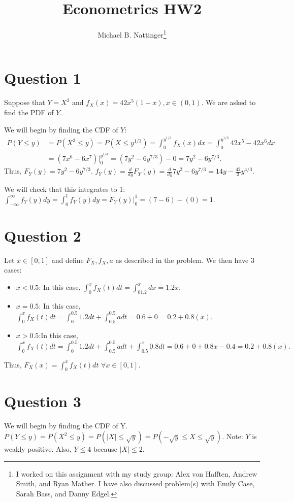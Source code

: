 \documentclass[11pt]{article} %
\title{Econometrics HW2}
\author{Michael B. Nattinger\footnote{I worked on this assignment with my study group: Alex von Hafften, Andrew Smith, and Ryan Mather. I have also discussed problem(s) with Emily Case, Sarah Bass, and Danny Edgel.}}
\begin{document}
\maketitle

\section{Question 1}
Suppose that $Y = X^{3}$ and $f_X(x) = 42x^5(1-x), x \in (0,1).$ We are asked to find the PDF of $Y$.

We will begin by finding the CDF of $Y$:
\begin{align*}
P(Y\leq y) &= P(X^{3} \leq y) = P(X \leq y^{1/3}) = \int_0^{y^{1/3}} f_X(x)dx =  \int_0^{y^{1/3}}42x^5 - 42x^6dx \\
&= (7x^6 - 6x^7)|^{y^{1/3}}_{0} = (7y^2 - 6y^{7/3}) - 0 = 7y^2 - 6y^{7/3}.
\end{align*}
Thus, $F_Y(y) =  7y^2 - 6y^{7/3}$. $f_Y(y) = \frac{d}{dy} F_Y(y) =  \frac{d}{dy} 7y^2 - 6y^{7/3} = 14y - \frac{42}{3}y^{4/3}$.

We will check that this integrates to 1:
$\int_{-\infty}^{\infty} f_Y(y)dy = \int_0^1f_Y(y)dy = F_Y(y)|^{1}_{0} = (7 - 6) - (0) = 1. $

\section{Question 2}
Let $x \in [0,1]$ and define $F_X,f_X,a$ as described in the problem. We then have 3 cases:

\begin{itemize}
\item $x<0.5$: In this case, $\int^{x}_0 f_X(t)dt = \int^{x}_01.2 dx = 1.2x.$
\item $x=0.5$: In this case,  $\int^{x}_0 f_X(t)dt = \int^{0.5}_0 1.2dt + \int^{0.5}_{0.5} a dt = 0.6 + 0 = 0.2+0.8(x).$
\item $x>0.5$:In this case,  $\int^{x}_0 f_X(t)dt = \int^{0.5}_0 1.2dt + \int^{0.5}_{0.5} a dt + \int^{x}_{0.5} 0.8 dt = 0.6 + 0 + 0.8x - 0.4 = 0.2+0.8(x).$
\end{itemize}

Thus, $F_X(x) = \int_0^x f_X(t)dt$ $\forall x \in [0,1].$

\section{Question 3}
We will begin by finding the CDF of Y. $P(Y\leq y) = P(X^2 \leq y) = P(|X| \leq \sqrt{y}) = P(-\sqrt{y}\leq X \leq \sqrt{y})$. Note: $Y$ is weakly positive. Also, $Y\leq 4$ because $|X| \leq 2. $
\end{document}
